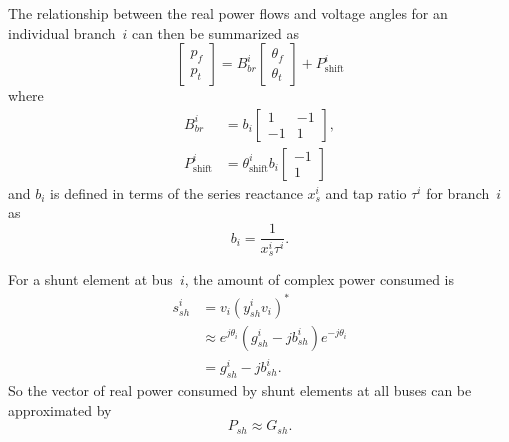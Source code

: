 \documentclass[12pt]{article}
\numberwithin{equation}{section}
\numberwithin{table}{section}
\numberwithin{figure}{section}
\begin{document}
The relationship between the real power flows and voltage angles for an individual branch~$i$ can then be summarized as
\begin{equation}
\left[\begin{array}{c}p_f \\ p_t\end{array}\right] = B_{br}^i\left[\begin{array}{c} \theta_f \\ \theta_t \end{array}\right] + P_\mathrm{shift}^i
\end{equation}
where
\begin{align}
B_{br}^i &= b_i \left[\begin{array}{rr} 1 & -1 \\ -1 & 1  \end{array}\right], \nonumber\\
P_\mathrm{shift}^i &= \theta^i_\mathrm{shift} b_i \left[\begin{array}{r}-1 \\ 1\end{array}\right]\nonumber
\end{align}
and $b_i$ is defined in terms of the series reactance $x_s^i$ and tap ratio $\tau^i$ for branch~$i$ as
\begin{displaymath}
b_i = \frac{1}{x^i_s \tau^i}.
\end{displaymath}

For a shunt element at bus~$i$, the amount of complex power consumed is
\begin{align}
s^i_{sh} &= v_i (y^i_{sh} v_i)^* \nonumber\\
&\approx e^{j \theta_i} (g^i_{sh} - j b^i_{sh}) e^{-j \theta_i} \nonumber\\
&= g^i_{sh} - j b^i_{sh}.
\end{align}
So the vector of real power consumed by shunt elements at all buses can be approximated by
\begin{equation}
P_{sh} \approx G_{sh}.
\end{equation}
\end{document}
